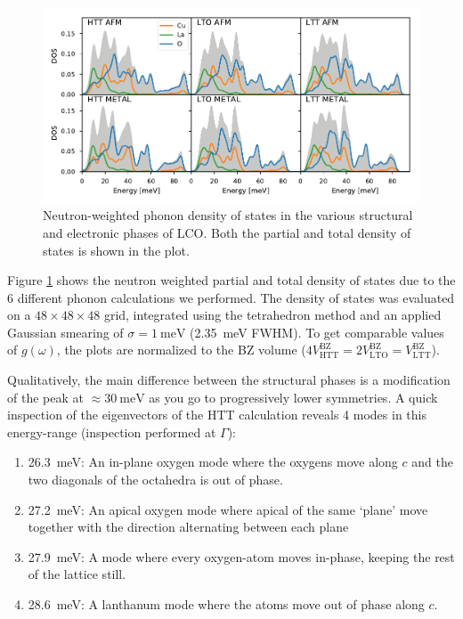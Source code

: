 \begin{figure}
	\centering
	\includegraphics[width=\textwidth]{fig/simulation/phonopy_pdos.pdf}
	\caption[Neutron DOS (frozen-phonons)]{Neutron-weighted phonon density of states in the various structural and electronic phases of LCO. Both the partial and total density of states is shown in the plot.}
	\label{fig:dos_all}
\end{figure}

Figure \ref{fig:dos_all} shows the neutron weighted partial and total density of states due to the 6 different phonon calculations we performed. The density of states was evaluated on a $48 \times 48 \times 48$ grid, integrated using the tetrahedron method and an applied Gaussian smearing of $\sigma=\SI{1}{\milli\eV}$ (\SI{2.35}{\milli\eV} FWHM). To get comparable values of $g(\omega)$, the plots are normalized to the BZ volume ($4V^\text{BZ}_\text{HTT} = 2 V^\text{BZ}_\text{LTO} = V^\text{BZ}_\text{LTT}$).

Qualitatively, the main difference between the structural phases is a modification of the peak at $\approx \SI{30}{\milli\eV}$ as you go to progressively lower symmetries. A quick inspection of the eigenvectors of the HTT calculation reveals 4 modes in this energy-range (inspection performed at $\Gamma$):

\begin{enumerate}
	\item \SI{26.3}{\milli\eV}: An in-plane oxygen mode where the oxygens move along $c$ and the two diagonals of the octahedra is out of phase.
	\item \SI{27.2}{\milli\eV}: An apical oxygen mode where apical of the same `plane' move together with the direction alternating between each plane
	\item \SI{27.9}{\milli\eV}: A mode where every oxygen-atom moves in-phase, keeping the rest of the lattice still.
	\item \SI{28.6}{\milli\eV}: A lanthanum mode where the atoms move out of phase along $c$.
\end{enumerate}

